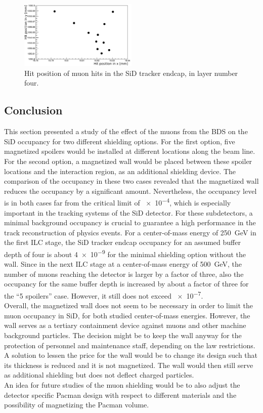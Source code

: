  \begin{figure}[htbp!]
\centering
\includegraphics[width=0.5\textwidth]{Figures/BDS_muons/LoopInACell.png}
\caption[BDS muons looping]{Hit position of muon hits in the SiD tracker endcap, in layer number four.}
\label{fig:BDS_Muons:loop}
\end{figure}

\subsection{Conclusion}
This section presented a study of the effect of the muons from the BDS on the SiD occupancy for two different shielding options.
For the first option, five magnetized spoilers would be installed at different locations along the beam line.
For the second option, a magnetized wall would be placed between these spoiler locations and the interaction region, as an additional shielding device.
The comparison of the occupancy in these two cases revealed that the magnetized wall reduces the occupancy by a significant amount.
Nevertheless, the occupancy level is in both cases far from the critical limit of \num{e-4}, which is especially important in the tracking systems of the SiD detector.
For these subdetectors, a minimal background occupancy is crucial to guarantee a high performance in the track reconstruction of physics events.
For a center-of-mass energy of \SI{250}{\GeV} in the first ILC stage, the SiD tracker endcap occupancy for an assumed buffer depth of four is about \num{4e-9} for the minimal shielding option without the wall.
Since in the next ILC stage at a center-of-mass energy of \SI{500}{\GeV}, the number of muons reaching the detector is larger by a factor of three, also the occupancy for the same buffer depth is increased by about a factor of three for the ``5 spoilers'' case.
However, it still does not exceed \num{e-7}.
\\Overall, the magnetized wall does not seem to be necessary in order to limit the muon occupancy in SiD, for both studied center-of-mass energies.
However, the wall serves as a tertiary containment device against muons and other machine background particles.
The decision might be to keep the wall anyway for the protection of personnel and maintenance staff, depending on the law restrictions.
A solution to lessen the price for the wall would be to change its design such that its thickness is reduced and it is not magnetized.
The wall would then still serve as additional shielding but does not deflect charged particles. \\An idea for future studies of the muon shielding would be to also adjust the detector specific Pacman design with respect to different materials and the possibility of magnetizing the Pacman volume.

